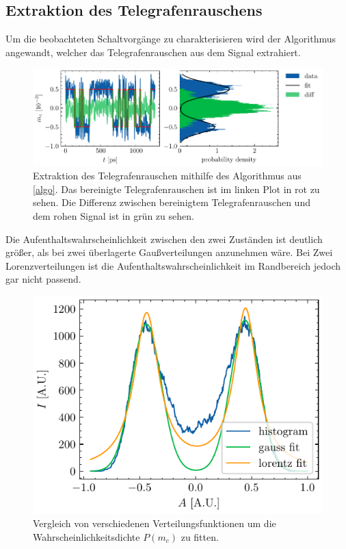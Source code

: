 \documentclass[main.tex]{subfiles}
\begin{document}
\subsection{Extraktion des Telegrafenrauschens}

Um die beobachteten Schaltvorgänge zu charakterisieren wird der Algorithmus  angewandt, welcher das Telegrafenrauschen aus dem Signal extrahiert.

\begin{figure}[H]
    \centering
    \includegraphics{bilder/plots/Bz_0mT/mc_fit_hist_part2_26.03meV.pdf}
    \caption{Extraktion des Telegrafenrauschen mithilfe des Algorithmus aus \cref{algo}. Das bereinigte Telegrafenrauschen ist im linken Plot in rot zu sehen. Die Differenz zwischen bereinigtem Telegrafenrauschen und dem rohen Signal ist in grün zu sehen.}\label{fig:extraktion-tgr}
\end{figure}

Die Aufenthaltswahrscheinlichkeit zwischen den zwei Zuständen ist deutlich größer, als bei zwei überlagerte Gaußverteilungen anzunehmen wäre. Bei Zwei Lorenzverteilungen ist die Aufenthaltswahrscheinlichkeit im Randbereich jedoch gar nicht passend.

\begin{figure}[H]
    \centering
    \includegraphics{bilder/plots/theo-vis/hist_fit_comp.pdf}
    \caption{Vergleich von verschiedenen Verteilungsfunktionen um die Wahrscheinlichkeitsdichte $P(m_c)$ zu fitten.}\label{fig:fit_func_comp}
\end{figure}
\end{document}
